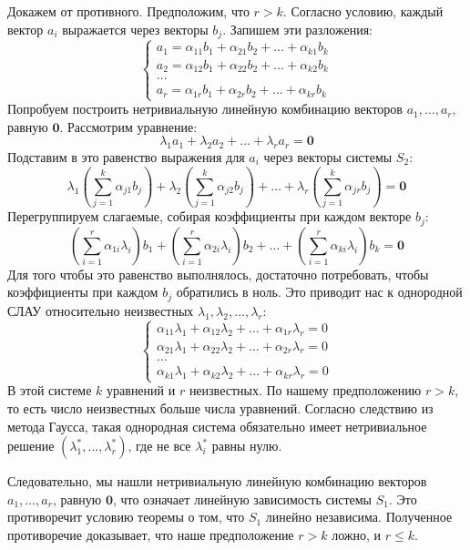 \begin{tcolorbox}[title=Доказательство, breakable]
Докажем от противного. Предположим, что $r > k$.
Согласно условию, каждый вектор $a_i$ выражается через векторы $b_j$. Запишем эти разложения:
\[
\begin{cases}
a_1 = \alpha_{11} b_1 + \alpha_{21} b_2 + \dots + \alpha_{k1} b_k \\
a_2 = \alpha_{12} b_1 + \alpha_{22} b_2 + \dots + \alpha_{k2} b_k \\
\dots \\
a_r = \alpha_{1r} b_1 + \alpha_{2r} b_2 + \dots + \alpha_{kr} b_k
\end{cases}
\]
Попробуем построить нетривиальную линейную комбинацию векторов $a_1, \dots, a_r$, равную $\mathbf{0}$. Рассмотрим уравнение:
\[ \lambda_1 a_1 + \lambda_2 a_2 + \dots + \lambda_r a_r = \mathbf{0} \]
Подставим в это равенство выражения для $a_i$ через векторы системы $S_2$:
\[ \lambda_1 \left( \sum_{j=1}^k \alpha_{j1} b_j \right) + \lambda_2 \left( \sum_{j=1}^k \alpha_{j2} b_j \right) + \dots + \lambda_r \left( \sum_{j=1}^k \alpha_{jr} b_j \right) = \mathbf{0} \]
Перегруппируем слагаемые, собирая коэффициенты при каждом векторе $b_j$:
\[ \left( \sum_{i=1}^r \alpha_{1i} \lambda_i \right) b_1 + \left( \sum_{i=1}^r \alpha_{2i} \lambda_i \right) b_2 + \dots + \left( \sum_{i=1}^r \alpha_{ki} \lambda_i \right) b_k = \mathbf{0} \]
Для того чтобы это равенство выполнялось, достаточно потребовать, чтобы коэффициенты при каждом $b_j$ обратились в ноль. Это приводит нас к однородной СЛАУ относительно неизвестных $\lambda_1, \lambda_2, \dots, \lambda_r$:
\[
\begin{cases}
\alpha_{11} \lambda_1 + \alpha_{12} \lambda_2 + \dots + \alpha_{1r} \lambda_r = 0 \\
\alpha_{21} \lambda_1 + \alpha_{22} \lambda_2 + \dots + \alpha_{2r} \lambda_r = 0 \\
\dots \\
\alpha_{k1} \lambda_1 + \alpha_{k2} \lambda_2 + \dots + \alpha_{kr} \lambda_r = 0
\end{cases}
\]
В этой системе $k$ уравнений и $r$ неизвестных. По нашему предположению $r > k$, то есть число неизвестных больше числа уравнений. Согласно следствию из метода Гаусса, такая однородная система обязательно имеет нетривиальное решение $(\lambda^*_1, \dots, \lambda^*_r)$, где не все $\lambda^*_i$ равны нулю.

Следовательно, мы нашли нетривиальную линейную комбинацию векторов $a_1, \dots, a_r$, равную $\mathbf{0}$, что означает линейную зависимость системы $S_1$. Это противоречит условию теоремы о том, что $S_1$ линейно независима. Полученное противоречие доказывает, что наше предположение $r > k$ ложно, и $r \le k$.
\end{tcolorbox}

